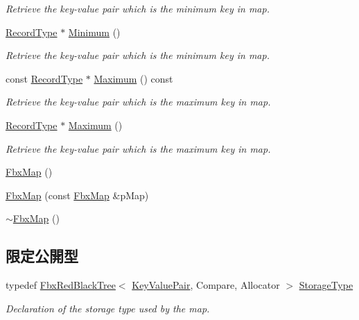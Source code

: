 \begin{DoxyCompactItemize}
\begin{DoxyCompactList}\small\item\em Retrieve the key-\/value pair which is the minimum key in map. \end{DoxyCompactList}\item 
\hyperlink{class_fbx_map_af8fc887461b3bf29f41aa36d15ddb54f}{Record\+Type} $\ast$ \hyperlink{class_fbx_map_a5ea3f42780e9896b0503f9a67ee8607e}{Minimum} ()
\begin{DoxyCompactList}\small\item\em Retrieve the key-\/value pair which is the minimum key in map. \end{DoxyCompactList}\item 
const \hyperlink{class_fbx_map_af8fc887461b3bf29f41aa36d15ddb54f}{Record\+Type} $\ast$ \hyperlink{class_fbx_map_af27d42885327b837114b1c51373be612}{Maximum} () const
\begin{DoxyCompactList}\small\item\em Retrieve the key-\/value pair which is the maximum key in map. \end{DoxyCompactList}\item 
\hyperlink{class_fbx_map_af8fc887461b3bf29f41aa36d15ddb54f}{Record\+Type} $\ast$ \hyperlink{class_fbx_map_a05a712e0a43083d5397ecda3003d81e1}{Maximum} ()
\begin{DoxyCompactList}\small\item\em Retrieve the key-\/value pair which is the maximum key in map. \end{DoxyCompactList}\item 
\hyperlink{class_fbx_map_a273b204e69895fed84c1193491f992c8}{Fbx\+Map} ()
\item 
\hyperlink{class_fbx_map_a3b0b46c7a7698ab185aea731bfe52b69}{Fbx\+Map} (const \hyperlink{class_fbx_map}{Fbx\+Map} \&p\+Map)
\item 
\hyperlink{class_fbx_map_ac0883128b3b0a4c25e55d153841d2a01}{$\sim$\+Fbx\+Map} ()
\end{DoxyCompactItemize}
\subsection*{限定公開型}
\begin{DoxyCompactItemize}
\item 
typedef \hyperlink{class_fbx_red_black_tree}{Fbx\+Red\+Black\+Tree}$<$ \hyperlink{class_fbx_map_1_1_key_value_pair}{Key\+Value\+Pair}, Compare, Allocator $>$ \hyperlink{class_fbx_map_ad7e4fa113e167dfd44f52993fa302c2d}{Storage\+Type}
\begin{DoxyCompactList}\small\item\em Declaration of the storage type used by the map. \end{DoxyCompactList}\end{DoxyCompactItemize}


